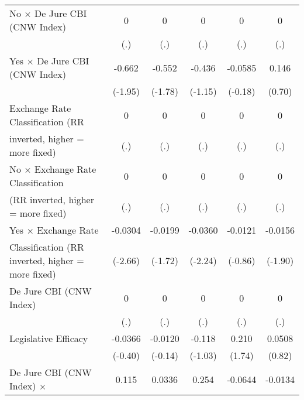 \begin{table}[htbp]
\begin{tabular}{l*{5}{c}}
No $\times$ De Jure CBI (CNW Index)     &        0         &        0         &        0         &        0         &        0         \\
                                        &      (.)         &      (.)         &      (.)         &      (.)         &      (.)         \\
\addlinespace
Yes $\times$ De Jure CBI (CNW Index)    &   -0.662         &   -0.552         &   -0.436         &  -0.0585         &    0.146         \\
                                        &  (-1.95)         &  (-1.78)         &  (-1.15)         &  (-0.18)         &   (0.70)         \\
\addlinespace
Exchange Rate Classification (RR        &        0         &        0         &        0         &        0         &        0         \\
inverted, higher = more fixed)          &      (.)         &      (.)         &      (.)         &      (.)         &      (.)         \\
\addlinespace
No $\times$ Exchange Rate Classification&        0         &        0         &        0         &        0         &        0         \\
(RR inverted, higher = more fixed)      &      (.)         &      (.)         &      (.)         &      (.)         &      (.)         \\
\addlinespace
Yes $\times$ Exchange Rate              &  -0.0304\sym{**} &  -0.0199         &  -0.0360\sym{*}  &  -0.0121         &  -0.0156         \\
Classification (RR inverted, higher = more fixed)&  (-2.66)         &  (-1.72)         &  (-2.24)         &  (-0.86)         &  (-1.90)         \\
\addlinespace
De Jure CBI (CNW Index)                 &        0         &        0         &        0         &        0         &        0         \\
                                        &      (.)         &      (.)         &      (.)         &      (.)         &      (.)         \\
\addlinespace
Legislative Efficacy                    &  -0.0366         &  -0.0120         &   -0.118         &    0.210         &   0.0508         \\
                                        &  (-0.40)         &  (-0.14)         &  (-1.03)         &   (1.74)         &   (0.82)         \\
\addlinespace
De Jure CBI (CNW Index) $\times$        &    0.115         &   0.0336         &    0.254         &  -0.0644         &  -0.0134         \\

\end{tabular}
\end{table}
